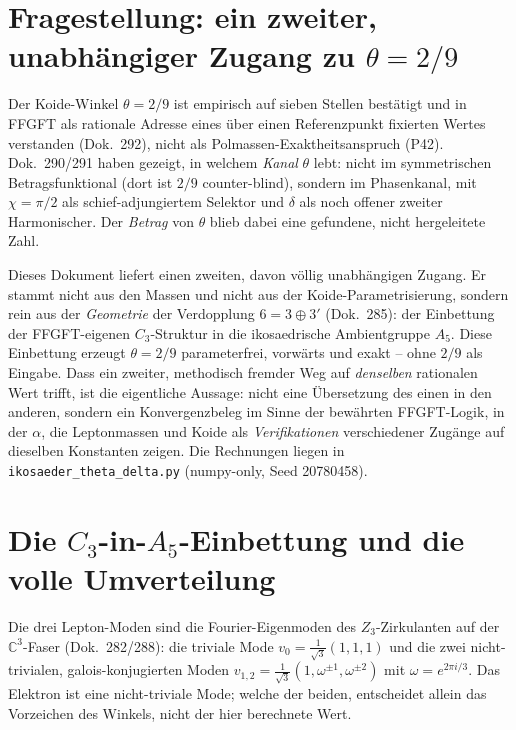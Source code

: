 \section{Fragestellung: ein zweiter, unabhängiger Zugang zu $\theta=2/9$}
Der Koide-Winkel $\theta=2/9$ ist empirisch auf sieben Stellen bestätigt und in FFGFT als
rationale Adresse eines über einen Referenzpunkt fixierten Wertes verstanden (Dok.~292), nicht
als Polmassen-Exaktheitsanspruch (P42). Dok.~290/291 haben gezeigt, in welchem \emph{Kanal}
$\theta$ lebt: nicht im symmetrischen Betragsfunktional (dort ist $2/9$ counter-blind), sondern
im Phasenkanal, mit $\chi=\pi/2$ als schief-adjungiertem Selektor und $\delta$ als noch offener
zweiter Harmonischer. Der \emph{Betrag} von $\theta$ blieb dabei eine gefundene, nicht
hergeleitete Zahl.

Dieses Dokument liefert einen zweiten, davon völlig unabhängigen Zugang. Er stammt nicht aus den
Massen und nicht aus der Koide-Parametrisierung, sondern rein aus der \emph{Geometrie} der
Verdopplung $6=3\oplus3'$ (Dok.~285): der Einbettung der FFGFT-eigenen $C_3$-Struktur in die
ikosaedrische Ambientgruppe $A_5$. Diese Einbettung erzeugt $\theta=2/9$ parameterfrei,
vorwärts und exakt -- ohne $2/9$ als Eingabe. Dass ein zweiter, methodisch fremder Weg auf
\emph{denselben} rationalen Wert trifft, ist die eigentliche Aussage: nicht eine Übersetzung des
einen in den anderen, sondern ein Konvergenzbeleg im Sinne der bewährten FFGFT-Logik, in der
$\alpha$, die Leptonmassen und Koide als \emph{Verifikationen} verschiedener Zugänge auf
dieselben Konstanten zeigen. Die Rechnungen liegen in \texttt{ikosaeder\_theta\_delta.py}
(numpy-only, Seed 20780458).

\section{Die $C_3$-in-$A_5$-Einbettung und die volle Umverteilung}
Die drei Lepton-Moden sind die Fourier-Eigenmoden des $Z_3$-Zirkulanten auf der
$\mathbb{C}^3$-Faser (Dok.~282/288): die triviale Mode $v_0=\tfrac{1}{\sqrt3}(1,1,1)$ und die
zwei nicht-trivialen, galois-konjugierten Moden $v_{1,2}=\tfrac{1}{\sqrt3}(1,\omega^{\pm1},
\omega^{\pm2})$ mit $\omega=e^{2\pi i/3}$. Das Elektron ist eine nicht-triviale Mode; welche der
beiden, entscheidet allein das Vorzeichen des Winkels, nicht der hier berechnete Wert.

